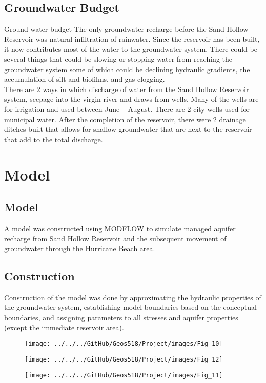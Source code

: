 \documentclass[]{report}
\begin{document}
 \subsection{Groundwater Budget}
Ground water budget The only groundwater recharge before the Sand Hollow Reservoir was natural infiltration of rainwater. Since the reservoir has been built, it now contributes most of the water to the groundwater system. There could be several things that could be slowing or stopping water from reaching the groundwater system some of which could be declining hydraulic gradients, the accumulation of silt and biofilms, and gas clogging.\\
  
There are 2 ways in which discharge of water from the Sand Hollow Reservoir system, seepage into the virgin river and draws from wells. Many of the wells are for irrigation and used between June – August. There are 2 city wells used for municipal water. After the completion of the reservoir, there were 2 drainage ditches built that allows for shallow groundwater that are next to the reservoir that add to the total discharge.\\
\section{Model}
\subsection{Model}
A model was constructed using MODFLOW to simulate managed aquifer recharge from Sand Hollow Reservoir and the subsequent movement of groundwater through the Hurricane Beach area.

\subsection{Construction}
Construction of the model was done by approximating the hydraulic properties of the groundwater system, establishing model boundaries based on the conceptual boundaries, and assigning parameters to all stresses and aquifer properties (except the immediate reservoir area).
\begin{figure}[h]
	\centering
	\begin{minipage}{0.4\textwidth}
		\texttt{[image: ../../../GitHub/Geos518/Project/images/Fig\_10]}
	\end{minipage}
	\hfill
	\begin{minipage}{0.4\textwidth}
		\texttt{[image: ../../../GitHub/Geos518/Project/images/Fig\_12]}
	\end{minipage}
\end{figure}
\begin{figure}[h]
	\centering
	\texttt{[image: ../../../GitHub/Geos518/Project/images/Fig\_11]}
\end{figure}
\end{document}
